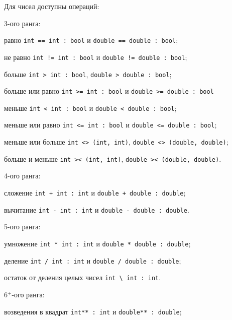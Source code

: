 Для чисел доступны операций:
\begin{icItems}
	\item
		3-ого ранга:
		\begin{icItems}
			\item
				равно \lstinline`int == int : bool` и \lstinline`double == double : bool`;
			\item
				не равно \lstinline`int != int : bool` и \lstinline`double != double : bool`;
			\item
			    больше \lstinline`int > int : bool`, \lstinline`double > double : bool`;
			\item
				больше или равно \lstinline`int >= int : bool` и \lstinline`double >= double : bool`
			\item
			    меньше \lstinline`int < int : bool` и \lstinline`double < double : bool`;
			\item
				меньше или равно \lstinline`int <= int : bool` и \lstinline`double <= double : bool`;
			\item
				меньше или больше \lstinline|int <> (int, int)|, \lstinline|double <> (double, double)|;
			\item
				больше и меньше \lstinline|int >< (int, int)|, \lstinline|double >< (double, double)|.
		\end{icItems}
	\item
		4-ого ранга:
		\begin{icItems}
			\item
				сложение \lstinline`int + int : int` и \lstinline`double + double : double`;
			\item
				вычитание \lstinline`int - int : int` и \lstinline`double - double : double`.
		\end{icItems}
	\item
		5-ого ранга:
		\begin{icItems}
			\item
				умножение \lstinline`int * int : int` и \lstinline`double * double : double`;
			\item
				деление \lstinline`int / int : int` и \lstinline`double / double : double`;
			\item
				остаток от деления целых чисел \lstinline`int \ int : int`.
		\end{icItems}
	\item
		6$^+$-ого ранга:
		\begin{icItems}
			\item
				возведения в квадрат \lstinline`int** : int` и \lstinline`double** : double`;
			\item

\end{icItems}
\end{icItems}

